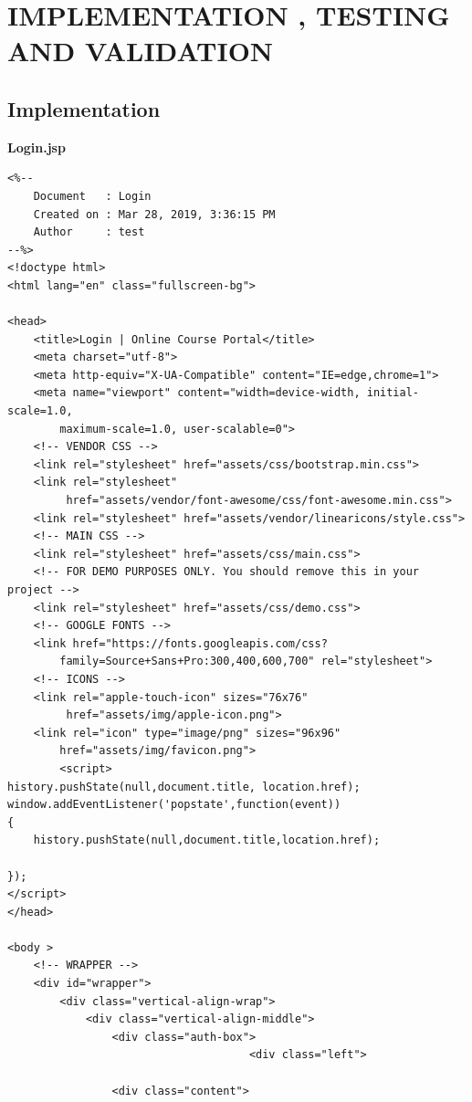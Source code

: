 %
%
%
%
\chapter{IMPLEMENTATION , TESTING AND VALIDATION}

\section{Implementation}

{\bf Login.jsp}
\begin{lstlisting}
<%-- 
    Document   : Login
    Created on : Mar 28, 2019, 3:36:15 PM
    Author     : test
--%>
<!doctype html>
<html lang="en" class="fullscreen-bg">

<head>
	<title>Login | Online Course Portal</title>
	<meta charset="utf-8">
	<meta http-equiv="X-UA-Compatible" content="IE=edge,chrome=1">
	<meta name="viewport" content="width=device-width, initial-scale=1.0, 
		maximum-scale=1.0, user-scalable=0">
	<!-- VENDOR CSS -->
	<link rel="stylesheet" href="assets/css/bootstrap.min.css">
	<link rel="stylesheet"
		 href="assets/vendor/font-awesome/css/font-awesome.min.css">
	<link rel="stylesheet" href="assets/vendor/linearicons/style.css">
	<!-- MAIN CSS -->
	<link rel="stylesheet" href="assets/css/main.css">
	<!-- FOR DEMO PURPOSES ONLY. You should remove this in your project -->
	<link rel="stylesheet" href="assets/css/demo.css">
	<!-- GOOGLE FONTS -->
	<link href="https://fonts.googleapis.com/css?
		family=Source+Sans+Pro:300,400,600,700" rel="stylesheet">
	<!-- ICONS -->
	<link rel="apple-touch-icon" sizes="76x76"
		 href="assets/img/apple-icon.png">
	<link rel="icon" type="image/png" sizes="96x96" 
		href="assets/img/favicon.png">
        <script>
history.pushState(null,document.title, location.href);
window.addEventListener('popstate',function(event))
{
    history.pushState(null,document.title,location.href);
    
});
</script>
</head>

<body >
	<!-- WRAPPER -->
	<div id="wrapper">
		<div class="vertical-align-wrap">
			<div class="vertical-align-middle">
				<div class="auth-box">
                                     <div class="left">
						
				<div class="content">
							

\end{lstlisting}
